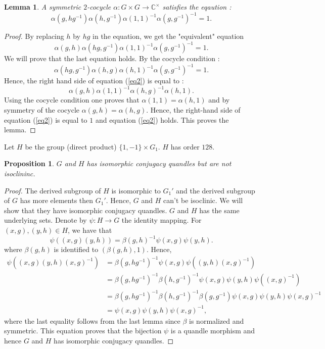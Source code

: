 \documentclass[12pt, reqno]{amsart}
\newtheorem{proposition}[theorem]{Proposition}
\newtheorem{lemma}[theorem]{Lemma}
\begin{document}
\begin{lemma}\cite{MM}\label{lem}
A symmetric $2$-cocycle $\alpha: G\times G\to \mathbb{C}^\times$ satisfies the eqaution :
$$\alpha(g,hg^{-1})\alpha(h,g^{-1})\alpha(1,1)^{-1}\alpha(g,g^{-1})^{-1}=1.$$
\end{lemma}
\begin{proof}
By replacing $h$ by $hg$ in the equation, we get the "equivalent" equation
\begin{equation}\label{eq2}
\alpha(g,h)\alpha(hg,g^{-1})\alpha(1,1)^{-1}\alpha(g,g^{-1})^{-1}=1.
\end{equation} 
We will prove that the last equation holds. By the cocycle condition : 
$$\alpha(hg,g^{-1}) \alpha(h,g)\alpha(h,1)^{-1}\alpha(g,g^{-1})^{-1}=1.$$
Hence, the right hand side of equation (\ref{eq2}) is equal to :
$$\alpha(g,h)\alpha(1,1)^{-1}\alpha(h,g)^{-1}\alpha(h,1).$$
Using the cocycle condition one proves that $\alpha(1,1)=\alpha(h,1)$ and by symmetry of the cocycle $\alpha(g,h)=\alpha(h,g)$. Hence, the right-hand side of equation (\ref{eq2}) is equal to $1$ and equation (\ref{eq2}) holds. This proves the lemma.
 \end{proof}
Let $H$ be the group (direct product) $\{1,-1\}\times G_1$. $H$ has order $128$.
\begin{proposition} 
$G$ and $H$ has isomorphic conjugacy quandles but are not isoclininc.
\end{proposition}
\begin{proof}
The derived subgroup of $H$ is isomorphic to $G_1'$ and the derived subgroup of $G$ has more elements then $G_1'$. Hence, $G$ and $H$ can't be isoclinic. We will show that they have isomorphic conjugacy quandles. $G$ and $H$ has the same underlying sets. Denote by $\psi: H\to G$ the identity mapping. For $(x,g),(y,h)\in H$, we have that 
$$\psi((x,g)(y,h))=\beta(g,h)^{-1}\psi(x,g)\psi(y,h).$$
where $\beta(g,h)$ is identified to $(\beta(g,h),1)$. Hence, 
\begin{align*}
\psi((x,g)(y,h)(x,g)^{-1})&=\beta(g,hg^{-1})^{-1}\psi(x,g)\psi((y,h)(x,g)^{-1})\\
&=\beta(g,hg^{-1})^{-1}\beta(h,g^{-1})^{-1}\psi(x,g)\psi(y,h)\psi((x,g)^{-1})\\
&=\beta(g,hg^{-1})^{-1}\beta(h,g^{-1})^{-1}\beta(g,g^{-1})\psi(x,g)\psi(y,h)\psi(x,g)^{-1}\\
&=\psi(x,g)\psi(y,h)\psi(x,g)^{-1},
\end{align*}
where the last equality follows from the last lemma since $\beta$ is normalized and symmetric. This equation proves that the bijection $\psi$ is a quandle morphism and hence $G$ and $H$ has isomorphic conjugacy quandles.
\end{proof}
\end{document}
